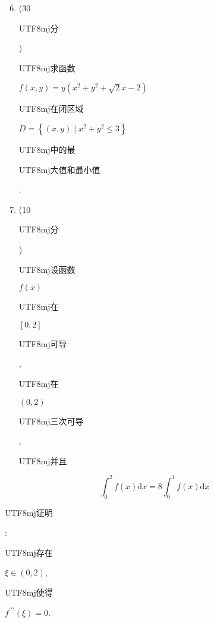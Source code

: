 \documentclass[10pt]{article}
\begin{document}
\begin{enumerate}
  \setcounter{enumi}{5}
  \item (30 \begin{CJK}{UTF8}{mj}分\end{CJK}) \begin{CJK}{UTF8}{mj}求函数\end{CJK} $f(x, y)=y\left(x^{2}+y^{2}+\sqrt{2} x-2\right)$ \begin{CJK}{UTF8}{mj}在闭区域\end{CJK} $D=\left\{(x, y) \mid x^{2}+y^{2} \leq 3\right\}$ \begin{CJK}{UTF8}{mj}中的最\end{CJK} \begin{CJK}{UTF8}{mj}大值和最小值\end{CJK}.

  \item (10 \begin{CJK}{UTF8}{mj}分\end{CJK}) \begin{CJK}{UTF8}{mj}设函数\end{CJK} $f(x)$ \begin{CJK}{UTF8}{mj}在\end{CJK} $[0,2]$ \begin{CJK}{UTF8}{mj}可导\end{CJK}, \begin{CJK}{UTF8}{mj}在\end{CJK} $(0,2)$ \begin{CJK}{UTF8}{mj}三次可导\end{CJK}, \begin{CJK}{UTF8}{mj}并且\end{CJK}

\end{enumerate}
$$
\int_{0}^{2} f(x) \mathrm{d} x=8 \int_{0}^{1} f(x) \mathrm{d} x
$$
\begin{CJK}{UTF8}{mj}证明\end{CJK}: \begin{CJK}{UTF8}{mj}存在\end{CJK} $\xi \in(0,2)$, \begin{CJK}{UTF8}{mj}使得\end{CJK} $f^{\prime \prime \prime}(\xi)=0$.
\end{document}
